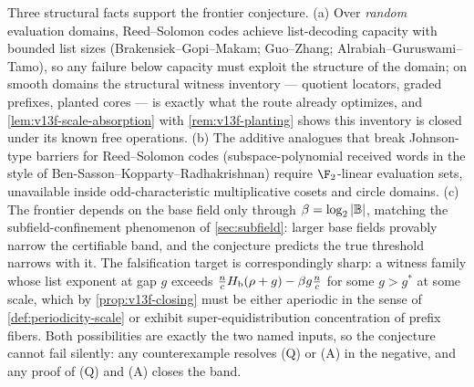 \begin{remark}\label{rem:v13f-evidence}
Three structural facts support the frontier conjecture.  \textup{(a)}  Over \emph{random} evaluation domains, Reed--Solomon codes achieve list-decoding capacity with bounded list sizes \textup(Brakensiek--Gopi--Makam; Guo--Zhang; Alrabiah--Guruswami--Tamo\textup), so any failure below capacity must exploit the structure of the domain; on smooth domains the structural witness inventory --- quotient locators, graded prefixes, planted cores --- is exactly what the route already optimizes, and \cref{lem:v13f-scale-absorption} with \cref{rem:v13f-planting} shows this inventory is closed under its known free operations.  \textup{(b)}  The additive analogues that break Johnson-type barriers for Reed--Solomon codes \textup(subspace-polynomial received words in the style of Ben-Sasson--Kopparty--Radhakrishnan\textup) require $\F_2$-linear evaluation sets, unavailable inside odd-characteristic multiplicative cosets and circle domains.  \textup{(c)}  The frontier depends on the base field only through $\beta=\log_2|\mathbb B|$, matching the subfield-confinement phenomenon of \cref{sec:subfield}: larger base fields provably narrow the certifiable band, and the conjecture predicts the true threshold narrows with it.  The falsification target is correspondingly sharp: a witness family whose list exponent at gap $g$ exceeds $\tfrac ncH_{\mathrm b}(\rho+g)-\beta g\tfrac nc$ for some $g>g^*$ at some scale, which by \cref{prop:v13f-closing} must be either aperiodic in the sense of \cref{def:periodicity-scale} or exhibit super-equidistribution concentration of prefix fibers.  Both possibilities are exactly the two named inputs, so the conjecture cannot fail silently: any counterexample resolves \textup{(Q)} or \textup{(A)} in the negative, and any proof of \textup{(Q)} and \textup{(A)} closes the band.
\end{remark}

